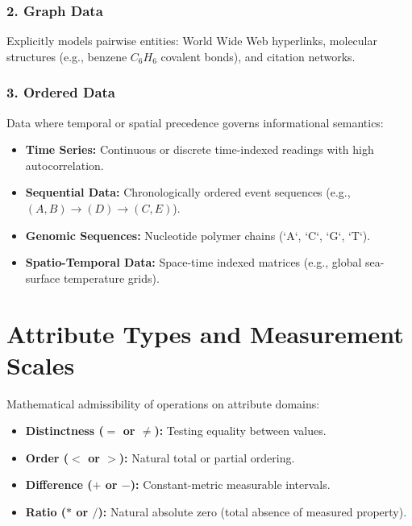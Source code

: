 \subsubsection{2. Graph Data}
Explicitly models pairwise entities: World Wide Web hyperlinks, molecular structures (e.g., benzene $C_6H_6$ covalent bonds), and citation networks.

\subsubsection{3. Ordered Data}
Data where temporal or spatial precedence governs informational semantics:
\begin{itemize}
    \item \textbf{Time Series:} Continuous or discrete time-indexed readings with high autocorrelation.
    \item \textbf{Sequential Data:} Chronologically ordered event sequences (e.g., $(A, B) \to (D) \to (C, E)$).
    \item \textbf{Genomic Sequences:} Nucleotide polymer chains (`A`, `C`, `G`, `T`).
    \item \textbf{Spatio-Temporal Data:} Space-time indexed matrices (e.g., global sea-surface temperature grids).
\end{itemize}

\FloatBarrier
\section{Attribute Types and Measurement Scales}

Mathematical admissibility of operations on attribute domains:
\begin{itemize}
    \item \textbf{Distinctness ($=$ or $\neq$):} Testing equality between values.
    \item \textbf{Order ($<$ or $>$):} Natural total or partial ordering.
    \item \textbf{Difference ($+$ or $-$):} Constant-metric measurable intervals.
    \item \textbf{Ratio ($*$ or $/$):} Natural absolute zero (total absence of measured property).
\end{itemize}


